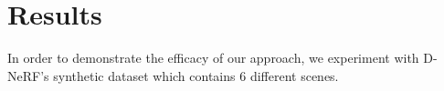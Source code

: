 \section{Results}

In order to demonstrate the efficacy of our approach, we experiment with D-NeRF's synthetic
dataset which contains 6 different scenes.

\begin{table}[t]

\end{table}
